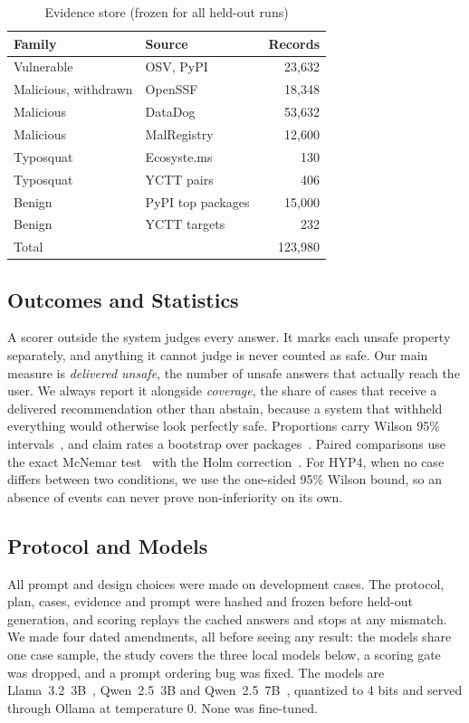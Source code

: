 \documentclass[conference]{IEEEtran}
\begin{document}
\begin{table}[t]
\caption{Evidence store (frozen for all held-out runs)}
\label{tab:store}
\centering
\small
\begin{tabular}{@{}llr@{}}
\toprule
Family & Source & Records \\
\midrule
Vulnerable & OSV, PyPI~\cite{osv} & 23{,}632 \\
Malicious, withdrawn & OpenSSF~\cite{ossfmal} & 18{,}348 \\
Malicious & DataDog~\cite{datadogmal} & 53{,}632 \\
Malicious & MalRegistry~\cite{guo2023} & 12{,}600 \\
Typosquat & Ecosyste.ms~\cite{ecosystems} & 130 \\
Typosquat & YCTT pairs~\cite{truong2025} & 406 \\
Benign & PyPI top packages~\cite{toppypi} & 15{,}000 \\
Benign & YCTT targets~\cite{truong2025} & 232 \\
\midrule
Total & & 123{,}980 \\
\bottomrule
\end{tabular}
\end{table}

\subsection{Outcomes and Statistics}
A scorer outside the system judges every answer. It marks each unsafe property separately, and anything it cannot
judge is never counted as safe. Our main measure is \emph{delivered unsafe}, the number of unsafe answers that
actually reach the user. We always report it alongside \emph{coverage}, the share of cases that receive a delivered
recommendation other than abstain, because a system that withheld everything would otherwise look perfectly safe.
Proportions carry Wilson 95\% intervals~\cite{wilson1927}, and claim rates a bootstrap over
packages~\cite{efron1993}. Paired comparisons use the exact McNemar test~\cite{mcnemar1947} with the Holm
correction~\cite{holm1979}. For HYP4, when no case differs between two conditions, we use the one-sided 95\% Wilson
bound, so an absence of events can never prove non-inferiority on its own.

\subsection{Protocol and Models}
All prompt and design choices were made on development cases. The protocol, plan,
cases, evidence and prompt were hashed and frozen before held-out generation, and scoring replays the cached answers
and stops at any mismatch. We made four dated amendments, all before seeing any result: the
models share one case sample, the study covers the three local models below, a scoring gate was dropped, and a
prompt ordering bug was fixed. The models are Llama~3.2~3B~\cite{llama3}, Qwen~2.5~3B and Qwen~2.5~7B~\cite{qwen25},
quantized to 4 bits and served through
Ollama at temperature 0. None was fine-tuned.
\end{document}
